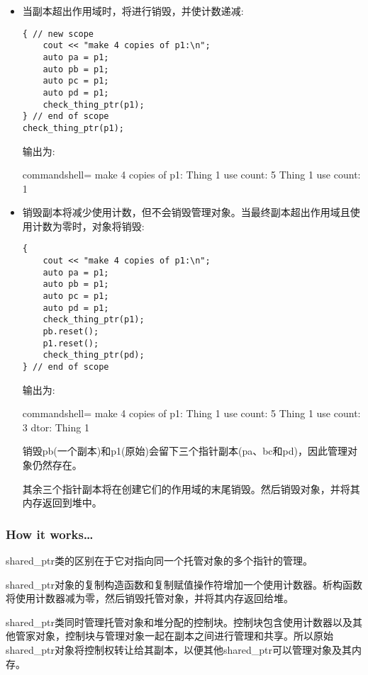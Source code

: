 \begin{itemize}
\item 
当副本超出作用域时，将进行销毁，并使计数递减:

\begin{lstlisting}[style=styleCXX]
{ // new scope
	cout << "make 4 copies of p1:\n";
	auto pa = p1;
	auto pb = p1;
	auto pc = p1;
	auto pd = p1;
	check_thing_ptr(p1);
} // end of scope
check_thing_ptr(p1);
\end{lstlisting}

输出为:

\begin{tcblisting}{commandshell={}}
make 4 copies of p1:
Thing 1 use count: 5
Thing 1 use count: 1
\end{tcblisting}

\item 
销毁副本将减少使用计数，但不会销毁管理对象。当最终副本超出作用域且使用计数为零时，对象将销毁:

\begin{lstlisting}[style=styleCXX]
{
	cout << "make 4 copies of p1:\n";
	auto pa = p1;
	auto pb = p1;
	auto pc = p1;
	auto pd = p1;
	check_thing_ptr(p1);
	pb.reset();
	p1.reset();
	check_thing_ptr(pd);
} // end of scope
\end{lstlisting}

输出为:

\begin{tcblisting}{commandshell={}}
make 4 copies of p1:
Thing 1 use count: 5
Thing 1 use count: 3
dtor: Thing 1
\end{tcblisting}

销毁pb(一个副本)和p1(原始)会留下三个指针副本(pa、bc和pd)，因此管理对象仍然存在。

其余三个指针副本将在创建它们的作用域的末尾销毁。然后销毁对象，并将其内存返回到堆中。

\end{itemize}

\subsubsection{How it works…}

shared\_ptr类的区别在于它对指向同一个托管对象的多个指针的管理。

shared\_ptr对象的复制构造函数和复制赋值操作符增加一个使用计数器。析构函数将使用计数器减为零，然后销毁托管对象，并将其内存返回给堆。

shared\_ptr类同时管理托管对象和堆分配的控制块。控制块包含使用计数器以及其他管家对象，控制块与管理对象一起在副本之间进行管理和共享。所以原始shared\_ptr对象将控制权转让给其副本，以便其他shared\_ptr可以管理对象及其内存。





























